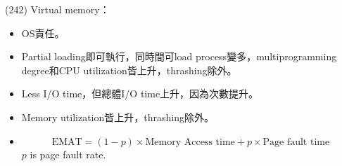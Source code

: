 \begin{theorem}{(242)} Virtual memory：\begin{itemize}
        \item OS責任。
        \item Partial loading即可執行，同時間可load process變多，multiprogramming degree和CPU utilization皆上升，thrashing除外。
        \item Less I/O time，但總體I/O time上升，因為次數提升。
        \item Memory utilization皆上升，thrashing除外。
        \item \begin{equation}
                \text{EMAT} = (1 - p) \times \text{Memory Access time} + p \times \text{Page fault time}
        \end{equation} $p$ is page fault rate.
    \end{itemize}
\end{theorem}

